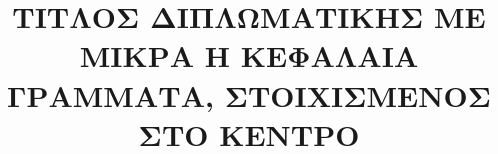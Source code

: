 \documentclass{uthece-thesis}
\title{ΤΙΤΛΟΣ ΔΙΠΛΩΜΑΤΙΚΗΣ ΜΕ ΜΙΚΡΑ H ΚΕΦΑΛΑΙΑ ΓΡΑΜΜΑΤΑ, ΣΤΟΙΧΙΣΜΕΝΟΣ ΣΤΟ ΚΕΝΤΡΟ}
\begin{document}
\frontmatter
\maketitle


%


\mainmatter
    
    
    
%


	



    

\ifgrthesisoption
    \renewcommand{\chaptername}{Παράρτημα}
\else
    \renewcommand{\chaptername}{Appendix}
\fi

    \renewcommand{\thechapter}{A} 
  		
    \renewcommand{\thechapter}{B}
    

%
%    

%
\end{document}
